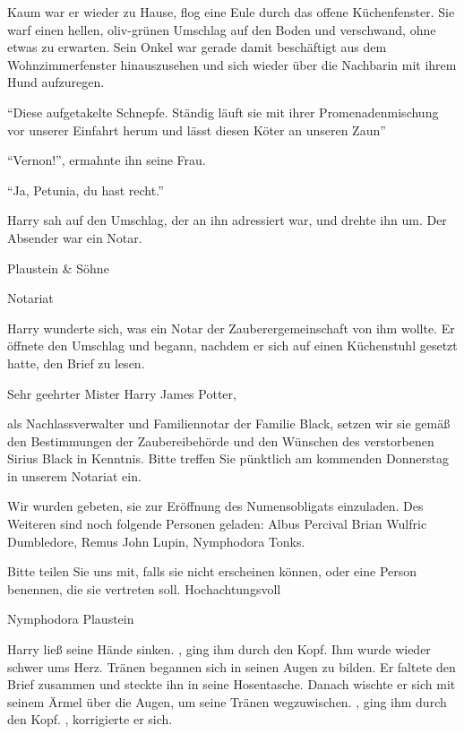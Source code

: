 Kaum war er wieder zu Hause, flog eine Eule durch das offene Küchenfenster. Sie warf einen hellen, oliv-grünen Umschlag auf den Boden und verschwand, ohne etwas zu erwarten. Sein Onkel war gerade damit beschäftigt aus dem Wohnzimmerfenster hinauszusehen und sich wieder über die Nachbarin mit ihrem Hund aufzuregen.

\enquote{Diese aufgetakelte Schnepfe. Ständig läuft sie mit ihrer Promenadenmischung vor unserer Einfahrt herum und lässt diesen Köter an unseren Zaun\abs}

\enquote{Vernon!}, ermahnte ihn seine Frau.

\enquote{Ja, Petunia, du hast recht.}

Harry sah auf den Umschlag, der an ihn adressiert war, und drehte ihn um. Der Absender war ein Notar.

\begin{brief}
Plaustein \& Söhne

Notariat
\end{brief}

Harry wunderte sich, was ein Notar der Zauberergemeinschaft von ihm wollte. Er öffnete den Umschlag und begann, nachdem er sich auf einen Küchenstuhl gesetzt hatte, den Brief zu lesen.

\begin{brief}
Sehr geehrter Mister Harry James Potter,

als Nachlassverwalter und Familiennotar der Familie Black, setzen wir sie gemäß den Bestimmungen der Zaubereibehörde und den Wünschen des verstorbenen Sirius Black in Kenntnis. Bitte treffen Sie pünktlich am kommenden Donnerstag in unserem Notariat ein.

Wir wurden gebeten, sie zur Eröffnung des Numensobligats einzuladen. Des Weiteren sind noch folgende Personen geladen: Albus Percival Brian Wulfric Dumbledore, Remus John Lupin, Nymphodora Tonks.

Bitte teilen Sie uns mit, falls sie nicht erscheinen können, oder eine Person benennen, die sie vertreten soll.
\signumspace
Hochachtungsvoll

Nymphodora Plaustein
\end{brief}

Harry ließ seine Hände sinken. , ging ihm durch den Kopf. Ihm wurde wieder schwer ums Herz. Tränen begannen sich in seinen Augen zu bilden. Er faltete den Brief zusammen und steckte ihn in seine Hosentasche. Danach wischte er sich mit seinem Ärmel über die Augen, um seine Tränen wegzuwischen. , ging ihm durch den Kopf. , korrigierte er sich.

